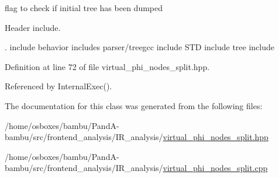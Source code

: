 flag to check if initial tree has been dumped 

Header include.

. include behavior includes parser/treegcc include S\+TD include tree include 

Definition at line 72 of file virtual\+\_\+phi\+\_\+nodes\+\_\+split.\+hpp.



Referenced by Internal\+Exec().



The documentation for this class was generated from the following files\+:\begin{DoxyCompactItemize}
\item 
/home/osboxes/bambu/\+Pand\+A-\/bambu/src/frontend\+\_\+analysis/\+I\+R\+\_\+analysis/\hyperlink{virtual__phi__nodes__split_8hpp}{virtual\+\_\+phi\+\_\+nodes\+\_\+split.\+hpp}\item 
/home/osboxes/bambu/\+Pand\+A-\/bambu/src/frontend\+\_\+analysis/\+I\+R\+\_\+analysis/\hyperlink{virtual__phi__nodes__split_8cpp}{virtual\+\_\+phi\+\_\+nodes\+\_\+split.\+cpp}\end{DoxyCompactItemize}
